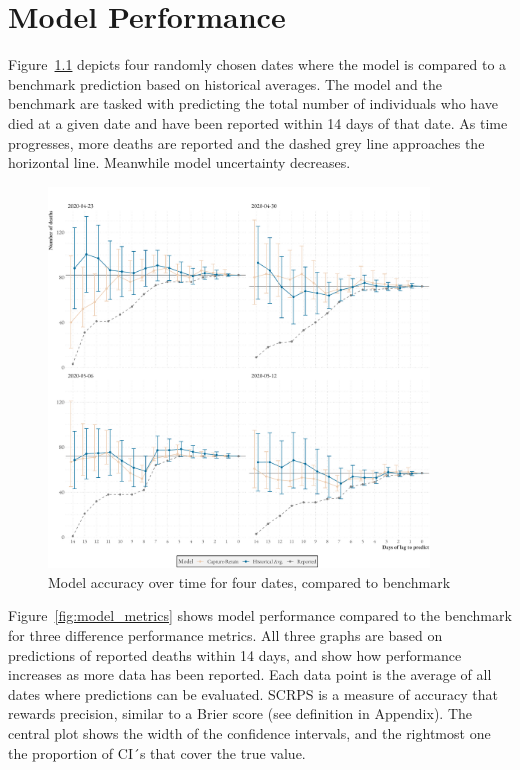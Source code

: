 \documentclass[a4paper,11pt,article,oneside,openany,american]{memoir}
\begin{document}
\chapter{Model Performance}

Figure~\ref{fig:four_dates} depicts four randomly chosen dates where the model is compared to a benchmark prediction based on historical averages. The model and the benchmark are tasked with predicting the total number of individuals who have died at a given date and have been reported within 14 days of that date. As time progresses, more deaths are reported and the dashed grey line approaches the horizontal line. Meanwhile model uncertainty decreases.

\begin{figure}
    \centering
    \includegraphics[width=0.9\textwidth]{../plots/lag_prediction_by_date}
    \caption{Model accuracy over time for four dates, compared to benchmark}
    \label{fig:four_dates}
\end{figure}

Figure~\ref{fig:model_metrics} shows model performance compared to the benchmark for three difference performance metrics. All three graphs are based on predictions of reported deaths within 14 days, and show how performance increases as more data has been reported. Each data point is the average of all dates where predictions can be evaluated. SCRPS is a measure of accuracy that rewards precision, similar to a Brier score (see definition in Appendix). The central plot shows the width of the confidence intervals, and the rightmost one the proportion of CI´s that cover the true value.
\end{document}
